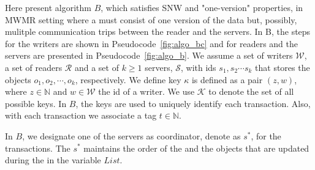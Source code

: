Here present  algorithm  $B$, which satisfies  SNW and "one-version" properties, in MWMR setting where a \rot{} must consist of one version of the data but, possibly, mulitple communication trips between the reader and the servers.%
In B, the steps for the writers are shown in Pseudocode~\ref{fig:algo_bc} and for readers and the servers  are presented in Pseudocode~\ref{fig:algo_b}.
We assume  a set of writers $\mathcal{W}$,  a set of readers $\mathcal{R}$ and a set of $k \geq 1$ servers,  $\mathcal{S}$, with ids $s_1, s_2\cdots s_k$ that stores the objects $o_1, o_2, \cdots, o_k$, respectively.  We define  key ${\kappa}$ is defined as a pair $(z, w)$, 
where $z \in \mathbb{N}$ and $w \in \mathcal{W}$ the  id of a writer. We use $\mathcal{K}$ to denote the set of all possible keys. 
In $B$, the keys are used to uniquely identify each transaction. Also, with each transaction we associate a tag $t \in \mathbb{N}$. 
	
In  $B$, we designate one of the servers as coordinator, denote as $s^*$,
 for the transactions. The $s^*$  maintains the order of the \wots{} and the objects that are updated during the \wot{} in the variable $List$.  %

